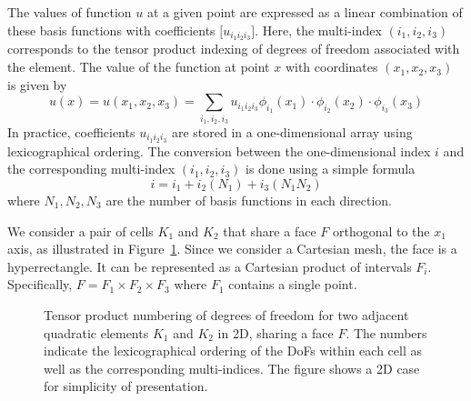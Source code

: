 \documentclass[11pt,a4paper]{article}
\begin{document}
The values of function \( u \) at a given point are expressed as a linear combination of these basis functions with
coefficients \( \bm{[}u_{i_1 i_2 i_3}\bm{]} \). Here, the multi-index \( (i_1, i_2, i_3 )\) corresponds to the tensor
product indexing of degrees of freedom associated with the element. The value of the function at point \( x \) with
coordinates \( (x_{1}, x_2, x_3) \) is given by
\begin{equation}
    u (x) =u(x_{1}, x_2, x_3) = \sum_{i_1, i_2, i_3} u_{i_1 i_2 i_3} \phi_{i_1}(x_{1}) \cdot \phi_{i_2}(x_{2}) \cdot
    \phi_{i_3}(x_3)
\end{equation}
In practice, coefficients  $u_{i_1 i_2 i_3}$ are stored in a one-dimensional array using lexicographical ordering.
The conversion between the one-dimensional index $i$ and the corresponding multi-index $(i_1, i_2, i_3)$ is
done using a simple formula
\begin{equation}
    i = i_1 + i_2 (N_1) + i_3 (N_1 N_2)
\end{equation}
where \( N_1, N_2, N_3 \) are the number of basis functions in each direction.

We consider a pair of cells \( K_1 \) and \( K_2 \) that share a face \( F \) orthogonal to the \( x_1 \) axis, as
illustrated in Figure~\ref{fig:tensor_product_numbering}. Since we consider a Cartesian mesh, the face is a
hyperrectangle. It can be represented as a Cartesian product of intervals $F_i$. Specifically, $F = F_1 \times F_2
    \times F_3$ where $F_1$ contains a single point.

\begin{figure}[!ht]
    \centering
    \caption{Tensor product numbering of degrees of freedom for two adjacent quadratic elements $K_1$ and $K_2$  in 2D,
        sharing a face $F$. The numbers indicate the lexicographical ordering of the DoFs within each cell as well
        as the corresponding multi-indices. The figure shows a 2D case for simplicity of presentation.}
    \label{fig:tensor_product_numbering}
\end{figure}
\end{document}
